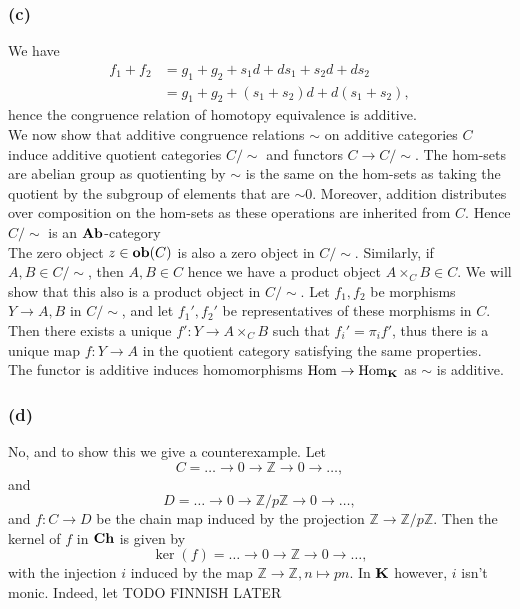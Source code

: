 \documentclass{article}
\theoremstyle{definition}
\newcommand{\Z}{\mathbb{Z}}
\newcommand{\Hom}{\text{Hom}}
\newcommand{\catname}[1]{{\normalfont\textbf{#1}}}
\newcommand{\Ch}{\catname{Ch}}
\newcommand{\Ab}{\catname{Ab}}
\newcommand{\CK}{\catname{K}}
\newcommand{\ob}{\catname{ob}}
\begin{document}
\subsubsection*{(c)}

We have
\begin{align*}
	f_1 + f_2
	&=
	g_1 + g_2 + s_1d + ds_1 + s_2d + ds_2 \\
	&=
	g_1 + g_2 + (s_1 + s_2)d + d(s_1 + s_2),
\end{align*}
hence the congruence relation of homotopy equivalence is additive. \\

We now show that additive congruence relations $\sim$ on additive categories
$C$ induce additive quotient categories $C / \sim$ and functors $C \to C /
\sim$. The hom-sets are abelian group as quotienting by $\sim$ is the same on
the hom-sets as taking the quotient by the subgroup of elements that are $\sim
0$. Moreover, addition distributes over composition on the hom-sets as these
operations are inherited from $C$. Hence $C / \sim$ is an $\Ab$-category \\

The zero object $z \in \ob(C)$ is also a zero object in $C / \sim$.
Similarly, if $A, B \in C/ \sim$, then $A, B \in C$ hence we have a product
object $A \times_C B \in C$. We will show that this also is a product object in
$C / \sim$. Let $f_1, f_2$ be morphisms $Y \to A, B$ in $C / \sim$, and let
$f_1', f_2'$ be representatives of these morphisms in $C$. Then there exists a
unique $f' : Y \to A \times_C B$ such that $f_i' = \pi_i f'$, thus there is a
unique map $f : Y \to A$ in the quotient category satisfying the same
properties. \\

The functor is additive induces homomorphisms $\Hom \to \Hom_{\CK}$ as $\sim$
is additive. \\

\subsubsection*{(d)}

No, and to show this we give a counterexample. Let
\[
	C = \ldots \rightarrow 0 \rightarrow \Z \rightarrow 0 \rightarrow \ldots,
\]
and
\[
	D = \ldots \rightarrow 0 \rightarrow \Z/p\Z \rightarrow 0 \rightarrow \ldots,
\]
and $f : C \to D$ be the chain map induced by the projection $\Z \to \Z/p\Z$.
Then the kernel of $f$ in $\Ch$ is given by
\[
	\ker(f) = \ldots \rightarrow 0 \rightarrow \Z \rightarrow 0 \rightarrow \ldots,
\]
with the injection $i$ induced by the map $\Z \to \Z, n \mapsto pn$. In $\CK$
however, $i$ isn't monic. Indeed, let TODO FINNISH LATER
\end{document}
